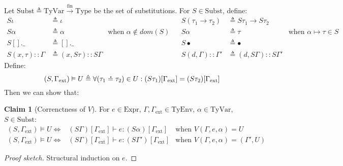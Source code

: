 \documentclass{article}
\theoremstyle{definition}
\newtheorem{clm}{Claim}[section]
\newcommand*{\cons}{::}
\newcommand*{\A}[1]{\overset{\,_{\mbox{\Large .}}}{#1}}
\newcommand*{\Expr}{\text{Expr}}
\newcommand*{\modid}{d}
\newcommand*{\fin}[2]{{#1}\xrightarrow{\text{fin}}{#2}}
\newcommand*{\TyEnv}{\text{TyEnv}}
\newcommand*{\TyVar}{\text{TyVar}}
\newcommand*{\Type}{\text{Type}}
\newcommand*{\Subst}{\text{Subst}}
\newcommand*{\external}{\Gamma_{\text{ext}}}
\begin{document}
Let $\Subst\triangleq\fin{\TyVar}{\Type}$ be the set of substitutions.
For $S\in\Subst$, define:
\begin{align*}
  S\iota               & \triangleq\iota                  &                                  &  & S(\tau_1\rightarrow\tau_2)   & \triangleq S\tau_1\rightarrow S\tau_2                                         \\
  S\alpha              & \triangleq\alpha                 & \text{when }\alpha\not\in dom(S) &  & S\alpha                      & \triangleq \tau                          & \text{when }\alpha\mapsto\tau\in S \\
  S[].\_               & \triangleq [].\_                 &                                  &  & S\bullet                     & \triangleq\bullet                                                             \\
  S(x,\tau)\cons\Gamma & \triangleq(x,S\tau)\cons S\Gamma &                                  &  & S(\modid,\Gamma)\cons\Gamma' & \triangleq(\modid,S\Gamma)\cons S\Gamma'
\end{align*}
Define:
\[(S,\external)\vDash U\triangleq\forall(\tau_1\A{=}\tau_2)\in U:(S\tau_1)[\external]= (S\tau_2)[\external]\]
Then we can show that:
\begin{clm}[Correnctness of $V$]
  For $e\in\Expr$, $\Gamma,\external\in\TyEnv$, $\alpha\in\TyVar$, $S\in\Subst$:
  \begin{align*}
    (S,\external)\vDash U \Leftrightarrow & (S\Gamma)[\external]\vdash e:(S\alpha)[\external]  & \text{when }V(\Gamma,e,\alpha)=U           \\
    (S,\external)\vDash U \Leftrightarrow & (S\Gamma)[\external]\vdash e:(S\Gamma')[\external] & \text{when }V(\Gamma,e,\alpha)=(\Gamma',U)
  \end{align*}
\end{clm}
\begin{proof}[Proof sketch]
  Structural induction on $e$.
\end{proof}
\end{document}
